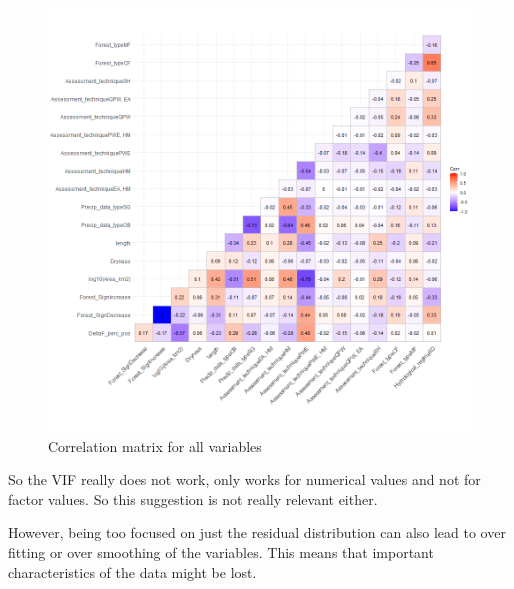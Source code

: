\documentclass[]{elsarticle} %
\begin{document}
\begin{figure}
\includegraphics[width=0.9\linewidth]{./testcorr_plot} \caption{Correlation matrix for all variables}\label{fig:corgraphs}
\end{figure}

So the VIF really does not work, only works for numerical values and not for factor values. So this suggestion is not really relevant either.

However, being too focused on just the residual distribution can also lead to over fitting or over smoothing of the variables. This means that important characteristics of the data might be lost.
\end{document}
